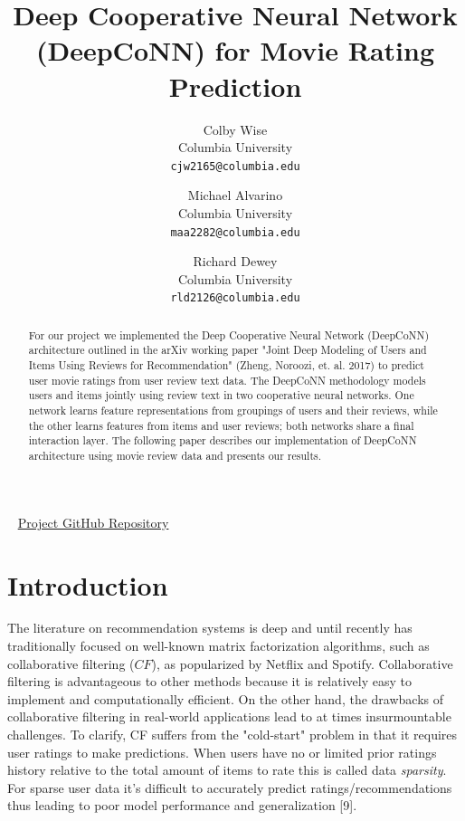\documentclass[10pt,twocolumn,letterpaper]{article}
\begin{document}
\title{Deep Cooperative Neural Network (DeepCoNN) for Movie Rating Prediction}

\author{Colby Wise\\
Columbia University\\
{\tt\small cjw2165@columbia.edu}
\and
Michael Alvarino\\
Columbia University\\
{\tt\small maa2282@columbia.edu}
\and
Richard Dewey\\
Columbia University\\
{\tt\small rld2126@columbia.edu}
}

\maketitle

\begin{abstract}
   For our project we implemented the Deep Cooperative Neural Network (DeepCoNN) 
   architecture outlined in the arXiv working paper 
   "Joint Deep Modeling of Users and Items Using Reviews for Recommendation" 
   (Zheng, Noroozi, et. al. 2017) to predict user movie ratings from user review text data. 
   The DeepCoNN methodology models users and items jointly using review text in two cooperative neural networks.
   One network learns feature representations from groupings of users and their reviews, while the other learns
   features from items and user reviews; both networks share a final interaction layer. The following paper
   describes our implementation of DeepCoNN architecture using movie review data and presents 
   our results.
\end{abstract}
\ \newline
\href{https://github.com/michaelAlvarino/Deep-Learning}{Project GitHub Repository}

\section{Introduction}

\par The literature on recommendation systems is deep and until recently has traditionally focused on well-known matrix factorization algorithms, such as collaborative filtering ($CF$), as popularized by Netflix and Spotify. Collaborative filtering is advantageous to other methods because it is relatively easy to implement and computationally efficient. On the other hand, the drawbacks of collaborative filtering in real-world applications lead to at times insurmountable challenges. To clarify, CF suffers from the "cold-start" problem in that it requires user ratings to make predictions. When users have no or limited prior ratings history relative to the total amount of items to rate this is called data \textit{sparsity}. For sparse user data it's difficult to accurately predict ratings/recommendations thus leading to poor model performance and generalization [9]. 
\end{document}
